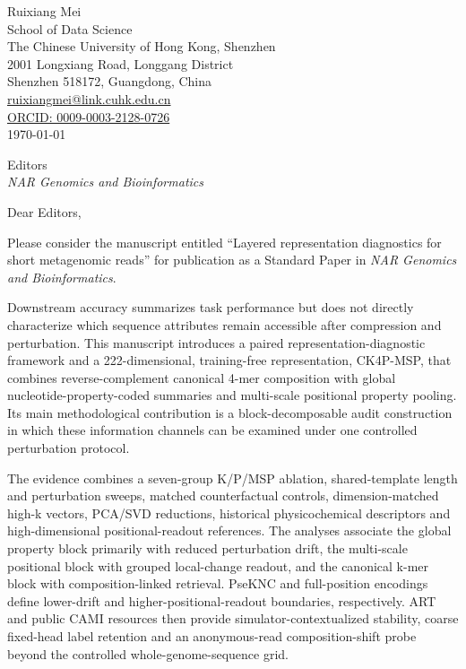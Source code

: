\documentclass[10pt]{article}
\begin{document}
\begin{flushright}
Ruixiang Mei\\
School of Data Science\\
The Chinese University of Hong Kong, Shenzhen\\
2001 Longxiang Road, Longgang District\\
Shenzhen 518172, Guangdong, China\\
\href{mailto:ruixiangmei@link.cuhk.edu.cn}{ruixiangmei@link.cuhk.edu.cn}\\
\href{https://orcid.org/0009-0003-2128-0726}{ORCID: 0009-0003-2128-0726}\\[3pt]
\today
\end{flushright}

Editors\\
\textit{NAR Genomics and Bioinformatics}

Dear Editors,

Please consider the manuscript entitled ``Layered representation diagnostics for short metagenomic reads'' for publication as a Standard Paper in \textit{NAR Genomics and Bioinformatics}.

Downstream accuracy summarizes task performance but does not directly characterize which sequence attributes remain accessible after compression and perturbation. This manuscript introduces a paired representation-diagnostic framework and a 222-dimensional, training-free representation, CK4P-MSP, that combines reverse-complement canonical 4-mer composition with global nucleotide-property-coded summaries and multi-scale positional property pooling. Its main methodological contribution is a block-decomposable audit construction in which these information channels can be examined under one controlled perturbation protocol.

The evidence combines a seven-group K/P/MSP ablation, shared-template length and perturbation sweeps, matched counterfactual controls, dimension-matched high-k vectors, PCA/SVD reductions, historical physicochemical descriptors and high-dimensional positional-readout references. The analyses associate the global property block primarily with reduced perturbation drift, the multi-scale positional block with grouped local-change readout, and the canonical k-mer block with composition-linked retrieval. PseKNC and full-position encodings define lower-drift and higher-positional-readout boundaries, respectively. ART and public CAMI resources then provide simulator-contextualized stability, coarse fixed-head label retention and an anonymous-read composition-shift probe beyond the controlled whole-genome-sequence grid.
\end{document}
